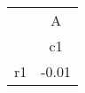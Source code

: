 \begin{tabular}{l*{1}{c}}
\hline\hline
            &           A\\
            &          c1\\
\hline
r1          &       -0.01\\
\hline\hline
\end{tabular}

